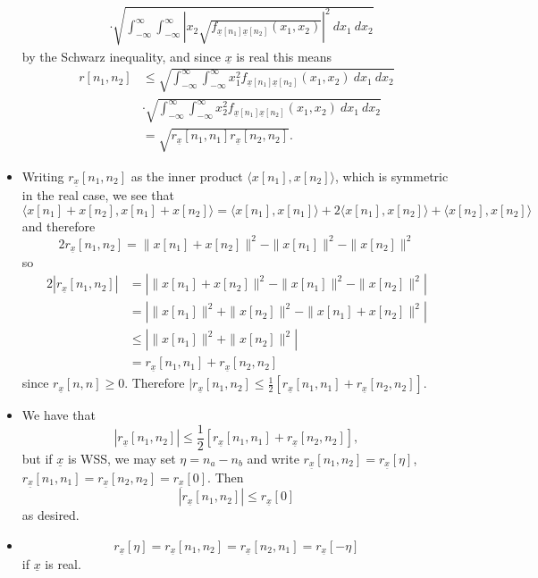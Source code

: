 \documentclass{article}
\begin{document}
\begin{itemize}
{\begin{align*}
   &\cdot
    \sqrt{\int_{-\infty}^{\infty}\int_{-\infty}^{\infty}
    \left|x_2 
          \sqrt{f_{\underline{x}[n_1] \underline{x}[n_2]}(x_1, x_2)}
    \right|^2 
     ~dx_1 ~dx_2}
  \end{align*}
  by the Schwarz inequality, and since $\underline{x}$ is real this means
  \begin{align*}
  r[n_1, n_2] &\leq
    \sqrt{\int_{-\infty}^{\infty}\int_{-\infty}^{\infty} 
    x_1^2 f_{\underline{x}[n_1] \underline{x}[n_2]}(x_1, x_2)
     ~dx_1 ~dx_2} \\
    & \cdot
    \sqrt{\int_{-\infty}^{\infty}\int_{-\infty}^{\infty}
    x_2^2 f_{\underline{x}[n_1] \underline{x}[n_2]}(x_1, x_2)
     ~dx_1 ~dx_2} \\
   &= \sqrt{r_{\underline{x}}[n_1,n_1]r_{\underline{x}}[n_2,n_2]}.
  \end{align*}
  }
  \item{
  Writing $r_{\underline{x}}[n_1, n_2]$ as the inner product
  $\langle x[n_1], x[n_2] \rangle$, which is symmetric in the real case,
  we see that
  $$
     \langle x[n_1] + x[n_2], x[n_1] + x[n_2] \rangle 
   =  \langle x[n_1], x[n_1] \rangle  
   + 2\langle x[n_1], x[n_2] \rangle 
   +  \langle x[n_2], x[n_2] \rangle
  $$
  and therefore
  $$
     2r_{\underline{x}}[n_1, n_2] 
   = \|x[n_1] + x[n_2]\|^2 - \|x[n_1]\|^2 - \|x[n_2]\|^2
  $$
  so
  \begin{align*}
     2|r_{\underline{x}}[n_1, n_2]| 
  &=    \left|\|x[n_1] + x[n_2]\|^2 - \|x[n_1]\|^2 - \|x[n_2]\|^2\right| \\
  &=    \left|\|x[n_1]\|^2 + \|x[n_2]\|^2 - \|x[n_1] + x[n_2]\|^2\right| \\
  &\leq \left|\|x[n_1]\|^2 + \|x[n_2]\|^2\right| \\
  &=    r_{\underline{x}}[n_1, n_1] + r_{\underline{x}}[n_2, n_2]
  \end{align*}
  since $r_{\underline{x}}[n,n] \geq 0$. Therefore 
  $|r_{\underline{x}}[n_1, n_2] 
  \leq \frac{1}{2}\left[r_{\underline{x}}[n_1, n_1] 
                      + r_{\underline{x}}[n_2, n_2]\right]$.
  }
  \item
  {
    We have that
    $$
    |r_{\underline{x}}[n_1,n_2]| \leq 
    \frac{1}{2}[r_{\underline{x}}[n_1,n_1] + r_{\underline{x}}[n_2,n_2]],
    $$
    but if $\underline{x}$ is WSS, we may set $\eta = n_a - n_b$ 
    and write $r_{\underline{x}}[n_1,n_2] = r_{\underline{x}}[\eta]$,
    $r_{\underline{x}}[n_1,n_1] = r_{\underline{x}}[n_2,n_2] 
    = r_{\underline{x}}[0]$. Then 
    $$
    |r_{\underline{x}}[n_1,n_2]| \leq 
    r_{\underline{x}}[0]
    $$
    as desired.
  }
  \item
  {
    $$
    r_{\underline{x}}[\eta] = r_{\underline{x}}[n_1,n_2]
                            = r_{\underline{x}}[n_2,n_1]
                            = r_{\underline{x}}[-\eta]
    $$
    if $\underline{x}$ is real.
  }
\end{itemize}
\end{document}
